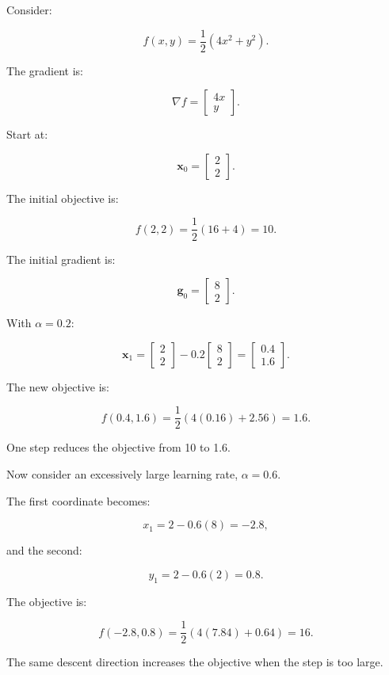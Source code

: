 \hypertarget{02-foundations-ii-ch026-exact-worked-example}{}

Consider:

\[
f(x,y)=\frac12(4x^2+y^2).
\]

The gradient is:

\[
\nabla f= \begin{bmatrix} 4x\\y \end{bmatrix}.
\]

Start at:

\[
\mathbf x_0= \begin{bmatrix}2\\2\end{bmatrix}.
\]

The initial objective is:

\[
f(2,2)=\frac12(16+4)=10.
\]

The initial gradient is:

\[
\mathbf g_0= \begin{bmatrix}8\\2\end{bmatrix}.
\]

With \(\alpha=0.2\):

\[
\mathbf x_1= \begin{bmatrix}2\\2\end{bmatrix} - 0.2 \begin{bmatrix}8\\2\end{bmatrix} = \begin{bmatrix}0.4\\1.6\end{bmatrix}.
\]

The new objective is:

\[
f(0.4,1.6) = \frac12(4(0.16)+2.56) =\boxed{1.6}.
\]

One step reduces the objective from 10 to 1.6.

Now consider an excessively large learning rate, \(\alpha=0.6\).

The first coordinate becomes:

\[
x_1=2-0.6(8)=-2.8,
\]

and the second:

\[
y_1=2-0.6(2)=0.8.
\]

The objective is:

\[
f(-2.8,0.8) = \frac12(4(7.84)+0.64) =\boxed{16}.
\]

The same descent direction increases the objective when the step is too large.

